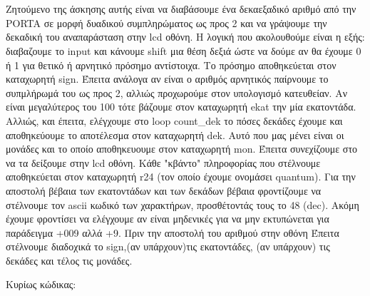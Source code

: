 \section{}
Ζητούμενο της άσκησης αυτής είναι να διαβάσουμε ένα δεκαεξαδικό αριθμό από την
PORTA σε μορφή δυαδικού συμπληρώματος ως προς 2 και να γράψουμε την δεκαδική
του αναπαράσταση στην lcd οθόνη.  Η λογική που ακολουθούμε είναι η εξής:
διαβαζουμε το input και κάνουμε shift μια θέση δεξιά ώστε να δούμε αν θα
έχουμε 0 ή 1 για θετικό ή αρνητικό πρόσημο αντίστοιχα. Το πρόσημο αποθηκεύεται
στον καταχωρητή sign.  Έπειτα ανάλογα αν είναι ο αριθμός αρνητικός παίρνουμε
το συπμλήρωμά του ως προς 2, αλλιώς προχωρούμε στον υπολογισμό κατευθείαν.  Αν
είναι μεγαλύτερος του 100 τότε βάζουμε στον καταχωρητή ekat την μία
εκατοντάδα. Αλλιώς, και έπειτα, ελέγχουμε στο loop count\_dek το πόσες δεκάδες
έχουμε και αποθηκεύουμε το αποτέλεσμα στον καταχωρητή dek.  Αυτό που μας μένει
είναι οι μονάδες και το οποίο αποθηκευουμε στον καταχωρητή mon. Έπειτα
συνεχίζουμε στο να τα δείξουμε στην lcd οθόνη. Κάθε "κβάντο" πληροφορίας που
στέλνουμε αποθηκεύεται στον καταχωρητή r24 (τον οποίο έχουμε ονομάσει
quantum). Για την αποστολή βέβαια των εκατοντάδων και των δεκάδων βέβαια
φροντίζουμε να στέλνουμε τον ascii κωδικό των χαρακτήρων, προσθέτοντάς τους το
48 (dec).  Ακόμη έχουμε φροντίσει να ελέγχουμε αν είναι μηδενικές για να μην
εκτυπώνεται για παράδειγμα +009 αλλά +9. Πριν την αποστολή του αριθμού στην
οθόνη Έπειτα στέλνουμε διαδοχικά το sign,(αν υπάρχουν)τις εκατοντάδες, (αν
υπάρχουν) τις δεκάδες και τέλος τις μονάδες.

\noindent Κυρίως κώδικας:
\inputminted[linenos,obeytabs,fontsize=\footnotesize]{c}{files/part6.S}
